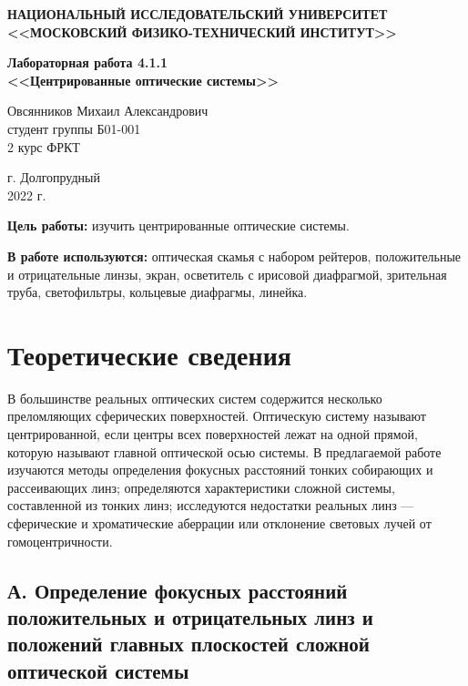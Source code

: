 \documentclass[a4paper,12pt]{article} %
\begin{document}
	
	
	\begin{center}
		
		
		\textbf{НАЦИОНАЛЬНЫЙ ИССЛЕДОВАТЕЛЬСКИЙ УНИВЕРСИТЕТ \\ <<МОСКОВСКИЙ ФИЗИКО-ТЕХНИЧЕСКИЙ ИНСТИТУТ>>}
		\vspace{13ex}
		
		\textbf{Лабораторная работа 4.1.1\\ <<Центрированные оптические системы>>}
		\vspace{40ex}
		
		\normalsize{Овсянников Михаил Александрович \\ студент группы Б01-001\\ 2 курс ФРКТ\\}
	\end{center}
	
	\vfill 
	
	\begin{center}
		г. Долгопрудный\\ 
		2022 г.
	\end{center}
	
	
	\thispagestyle{empty} %
	\newpage
	
	
	\textbf{Цель работы:} изучить центрированные оптические системы.
	
	\textbf{В работе используются:} оптическая скамья с набором рейтеров, положительные и отрицательные линзы, экран, осветитель с ирисовой диафрагмой, зрительная труба, светофильтры, кольцевые диафрагмы, линейка.
	
	\section*{Теоретические сведения}
	В большинстве реальных оптических систем содержится несколько преломляющих сферических поверхностей. Оптическую систему называют центрированной, если центры всех поверхностей лежат на одной прямой, которую называют главной оптической осью системы. В предлагаемой работе изучаются методы определения фокусных расстояний тонких собирающих и рассеивающих линз; определяются характеристики сложной системы, составленной из тонких линз; исследуются недостатки реальных линз — сферические и хроматические аберрации или отклонение световых лучей от гомоцентричности.
	
	\subsection*{А. Определение фокусных расстояний положительных и отрицательных линз и положений главных плоскостей сложной оптической системы}
	
\end{document}
